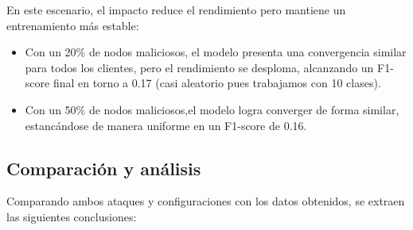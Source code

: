En este escenario, el impacto reduce el rendimiento pero mantiene un entrenamiento más estable:

\begin{itemize}
    \item Con un 20\% de nodos maliciosos, el modelo presenta una convergencia similar para todos los clientes, pero el rendimiento se desploma, alcanzando un F1-score final en torno a 0.17 (casi aleatorio pues trabajamos con 10 clases).
    \item Con un 50\% de nodos maliciosos,el modelo logra converger de forma similar, estancándose de manera uniforme en un F1-score de 0.16.
\end{itemize}


\subsection{Comparación y análisis}

Comparando ambos ataques y configuraciones con los datos obtenidos, se extraen las siguientes conclusiones:




